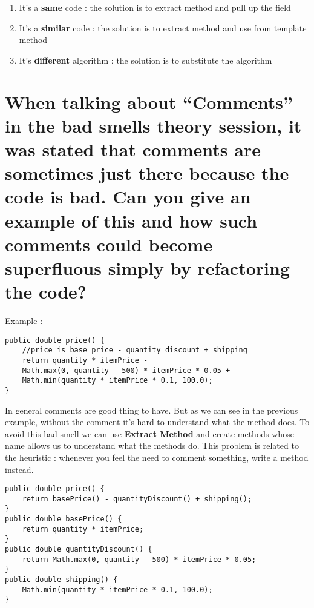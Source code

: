 \begin{enumerate}
\item It's a \textbf{same} code : the solution is to extract method and pull up the field
\item It's a \textbf{similar} code : the solution is to extract method and use from template method
\item It's \textbf{different} algorithm : the solution is to substitute the algorithm
\end{enumerate}






\section{When talking about “Comments” in the bad smells theory session, it was stated that comments are sometimes just there because the code is bad. Can you give an example of this and how such comments could become superfluous simply by refactoring the code?}

Example : \\

\begin{lstlisting}
public double price() {
	//price is base price - quantity discount + shipping
    return quantity * itemPrice -
    Math.max(0, quantity - 500) * itemPrice * 0.05 +
    Math.min(quantity * itemPrice * 0.1, 100.0);
}
\end{lstlisting}

In general comments are good thing to have. But as we can see in the previous example, without the comment it's hard to understand what the method does. To avoid this bad smell we can use \textbf{Extract Method} and create methods whose name allows us to understand what the methods do. This problem is related to the heuristic : whenever you feel the need to comment something, write a method instead.

\begin{lstlisting}
public double price() {
	return basePrice() - quantityDiscount() + shipping();
}
public double basePrice() {
	return quantity * itemPrice;
}
public double quantityDiscount() {
	return Math.max(0, quantity - 500) * itemPrice * 0.05;
}
public double shipping() {
	Math.min(quantity * itemPrice * 0.1, 100.0);
}
\end{lstlisting}
